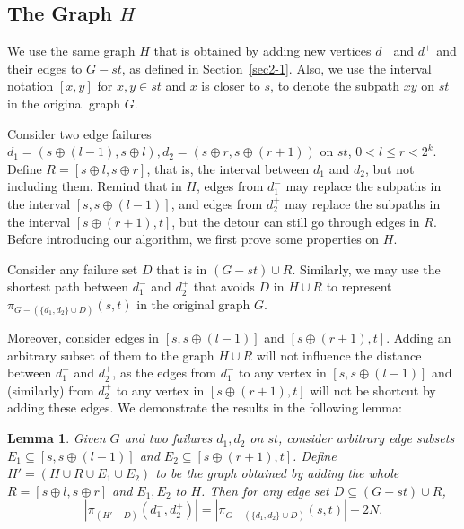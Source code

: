 \documentclass[11pt]{article}
\theoremstyle{plain}
\newtheorem{lemma}[theorem]{Lemma}
\theoremstyle{definition}
\newcommand{\set}[1]{\{ #1 \}}
\newcommand{\og}[3]{\pi_{G-#3}\left(#1,#2\right)}
\begin{document}
\subsection{The Graph $H$}

We use the same graph $H$ that is obtained by adding new vertices $d^-$ and $d^+$ and their edges to $G-st$, as defined in Section~\ref{sec2-1}. Also, we use the interval notation $[x,y]$ for $x,y\in st$ and $x$ is closer to $s$, to denote the subpath $xy$ on $st$ in the original graph $G$. 

Consider two edge failures $d_1=(s \oplus (l-1), s \oplus l),d_2=(s \oplus r, s \oplus (r+1))$ on $st$, $0 < l \leq r < 2^k$. Define $R=[s \oplus l, s\oplus r]$, that is, the interval between $d_1$ and $d_2$, but not including them. Remind that in $H$, edges from $d_1^-$ may replace the subpaths in the interval $[s, s \oplus (l-1)]$, and edges from $d_2^+$ may replace the subpaths in the interval $[s \oplus (r+1), t]$, but the detour can still go through edges in $R$. Before introducing our algorithm, we first prove some properties on $H$.

Consider any failure set $D$ that is in $(G-st) \cup R$. Similarly, we may use the shortest path between $d_1^-$ and $d_2^+$ that avoids $D$ in $H \cup R$ to represent $\og{s}{t}{(\set{d_1,d_2} \cup D)}$ in the original graph $G$. 

Moreover, consider edges in $[s,s\oplus(l-1)]$ and $[s\oplus(r+1),t]$. Adding an arbitrary subset of them to the graph $H \cup R$ will not influence the distance between $d_1^-$ and $d_2^+$, as the edges from $d_1^-$ to any vertex in $[s,s\oplus(l-1)]$ and (similarly) from $d_2^+$ to any vertex in $[s\oplus(r+1),t]$ will not be shortcut by adding these edges. We demonstrate the results in the following lemma:

\begin{lemma} \label{lemma:2edge}
    Given $G$ and two failures $d_1,d_2$ on $st$, consider arbitrary edge subsets $E_1 \subseteq [s,s\oplus(l-1)]$ and $E_2 \subseteq [s\oplus(r+1),t]$. Define $H' = (H \cup R \cup E_1 \cup E_2)$ to be the graph obtained by adding the whole $R=[s \oplus l, s \oplus r]$ and $E_1,E_2$ to $H$. Then for any edge set $D \subseteq (G-st) \cup R$,
\[|\pi_{(H'-D)}(d_1^-, d_2^+)| = |\og{s}{t}{(\set{d_1, d_2}\cup D)}|+2N.\]
    
\end{lemma}
\end{document}
